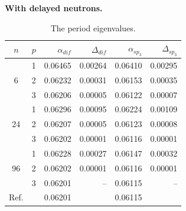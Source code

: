 \documentclass[authoryear]{elsarticle}
\begin{document}
\textbf{With delayed neutrons.}


\begin{table}[h]
\caption{The period eigenvalues.}
\label{tab:iaea_without_alpha_del}
\begin{center}
\begin{tabular}{c c r r r r}
\hline
$n$ & $p$ & $\alpha_{dif}$ & $\Delta_{dif}$ &$\alpha_{sp_3}$& $\Delta_{sp_3}$ \\
\hline
	& 1	&0.06465 &0.00264&0.06410 & 0.00295\\
6	& 2	&0.06232 &0.00031&0.06153 & 0.00035\\
	& 3	&0.06206 &0.00005&0.06122 & 0.00007\\ 
\hline
	& 1	&0.06296 &0.00095&0.06224 & 0.00109\\
24& 2	&0.06207 &0.00005&0.06123 & 0.00008\\
	& 3	&0.06202 &0.00001&0.06116 & 0.00001\\ 
\hline
	& 1	&0.06228 &0.00027&0.06147 & 0.00032\\
96& 2	&0.06202 &0.00001&0.06116 & 0.00001\\
	& 3	&0.06201 &     --&0.06115 &      --\\ 
\hline
Ref.& & 0.06201 & & 0.06115 \\ 
\hline
\end{tabular}
\end{center}
\end{table}
\end{document}
